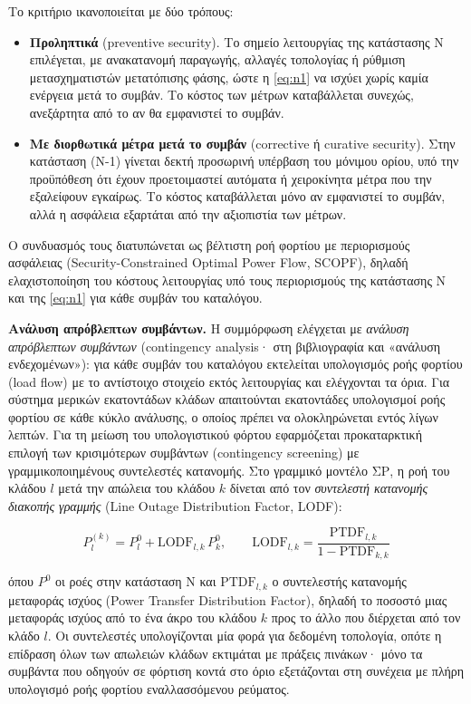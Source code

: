 Το κριτήριο ικανοποιείται με δύο τρόπους:

\begin{itemize}
\item \textbf{Προληπτικά} (preventive security). Το σημείο λειτουργίας της κατάστασης N
      επιλέγεται, με ανακατανομή παραγωγής, αλλαγές τοπολογίας ή ρύθμιση μετασχηματιστών
      μετατόπισης φάσης, ώστε η \eqref{eq:n1} να ισχύει χωρίς καμία ενέργεια μετά το
      συμβάν. Το κόστος των μέτρων καταβάλλεται συνεχώς, ανεξάρτητα από το αν θα εμφανιστεί
      το συμβάν.
\item \textbf{Με διορθωτικά μέτρα μετά το συμβάν} (corrective ή curative security). Στην
      κατάσταση (N-1) γίνεται δεκτή προσωρινή υπέρβαση του μόνιμου ορίου, υπό την
      προϋπόθεση ότι έχουν προετοιμαστεί αυτόματα ή χειροκίνητα μέτρα που την εξαλείφουν
      εγκαίρως. Το κόστος καταβάλλεται μόνο αν εμφανιστεί το συμβάν, αλλά η ασφάλεια
      εξαρτάται από την αξιοπιστία των μέτρων.
\end{itemize}

Ο συνδυασμός τους διατυπώνεται ως βέλτιστη ροή φορτίου με περιορισμούς ασφάλειας
(Security-Constrained Optimal Power Flow, SCOPF), δηλαδή ελαχιστοποίηση του κόστους
λειτουργίας υπό τους περιορισμούς της κατάστασης N και της \eqref{eq:n1} για κάθε συμβάν του
καταλόγου.

\textbf{Ανάλυση απρόβλεπτων συμβάντων.} Η συμμόρφωση ελέγχεται με \emph{ανάλυση απρόβλεπτων
συμβάντων} (contingency analysis· στη βιβλιογραφία και «ανάλυση ενδεχομένων»): για κάθε
συμβάν του καταλόγου εκτελείται υπολογισμός ροής φορτίου (load flow) με το αντίστοιχο
στοιχείο εκτός λειτουργίας και ελέγχονται τα όρια. Για σύστημα μερικών εκατοντάδων κλάδων
απαιτούνται εκατοντάδες υπολογισμοί ροής φορτίου σε κάθε κύκλο ανάλυσης, ο οποίος πρέπει να
ολοκληρώνεται εντός λίγων λεπτών. Για τη μείωση του υπολογιστικού φόρτου εφαρμόζεται
προκαταρκτική επιλογή των κρισιμότερων συμβάντων (contingency screening) με γραμμικοποιημένους
συντελεστές κατανομής. Στο γραμμικό μοντέλο ΣΡ, η ροή του κλάδου $l$ μετά την απώλεια του
κλάδου $k$ δίνεται από τον \emph{συντελεστή κατανομής διακοπής γραμμής} (Line Outage
Distribution Factor, LODF):

\begin{equation}
P_l^{(k)} = P_l^{0} + \mathrm{LODF}_{l,k}\, P_k^{0}, \qquad
\mathrm{LODF}_{l,k} = \frac{\mathrm{PTDF}_{l,k}}{1 - \mathrm{PTDF}_{k,k}}
\label{eq:lodf}
\end{equation}

όπου $P^{0}$ οι ροές στην κατάσταση N και $\mathrm{PTDF}_{l,k}$ ο συντελεστής κατανομής
μεταφοράς ισχύος (Power Transfer Distribution Factor), δηλαδή το ποσοστό μιας μεταφοράς
ισχύος από το ένα άκρο του κλάδου $k$ προς το άλλο που διέρχεται από τον κλάδο $l$. Οι
συντελεστές υπολογίζονται μία φορά για δεδομένη τοπολογία, οπότε η επίδραση όλων των
απωλειών κλάδων εκτιμάται με πράξεις πινάκων· μόνο τα συμβάντα που οδηγούν σε φόρτιση κοντά
στο όριο εξετάζονται στη συνέχεια με πλήρη υπολογισμό ροής φορτίου εναλλασσόμενου ρεύματος.

